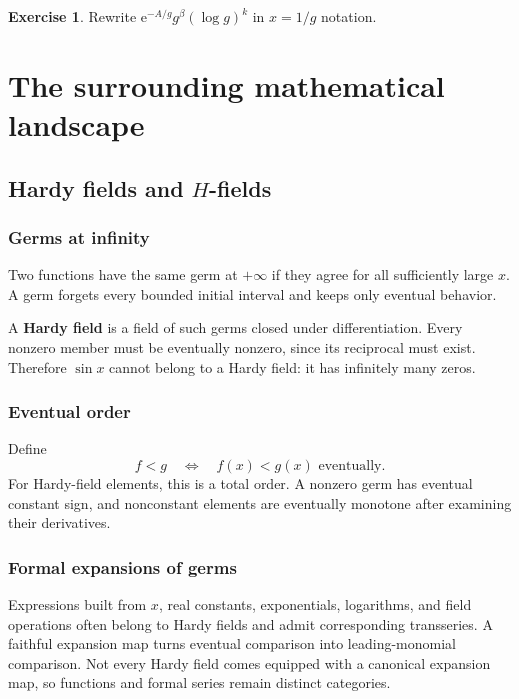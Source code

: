 \documentclass[11pt,oneside,openany]{book}
\newcommand{\e}{\mathrm{e}}
\theoremstyle{plain}
\theoremstyle{definition}
\newtheorem{exercise}{Exercise}[chapter]
\theoremstyle{remark}
\newcommand{\term}[1]{\textbf{#1}}
\begin{document}
\begin{exercise}
Rewrite $\e^{-A/g}g^\beta(\log g)^k$ in $x=1/g$ notation.
\end{exercise}


\part{The surrounding mathematical landscape}

\chapter{Hardy fields and \texorpdfstring{$H$}{H}-fields}
\label{ch:hfields}

\section{Germs at infinity}
Two functions have the same germ at $+\infty$ if they agree for all sufficiently large $x$. A germ forgets every bounded initial interval and keeps only eventual behavior.

A \term{Hardy field} is a field of such germs closed under differentiation. Every nonzero member must be eventually nonzero, since its reciprocal must exist. Therefore $\sin x$ cannot belong to a Hardy field: it has infinitely many zeros.

\section{Eventual order}
Define
\[
  f<g
  \quad\Longleftrightarrow\quad
  f(x)<g(x)\text{ eventually}.
\]
For Hardy-field elements, this is a total order. A nonzero germ has eventual constant sign, and nonconstant elements are eventually monotone after examining their derivatives.

\section{Formal expansions of germs}
Expressions built from $x$, real constants, exponentials, logarithms, and field operations often belong to Hardy fields and admit corresponding transseries. A faithful expansion map turns eventual comparison into leading-monomial comparison. Not every Hardy field comes equipped with a canonical expansion map, so functions and formal series remain distinct categories.
\end{document}
